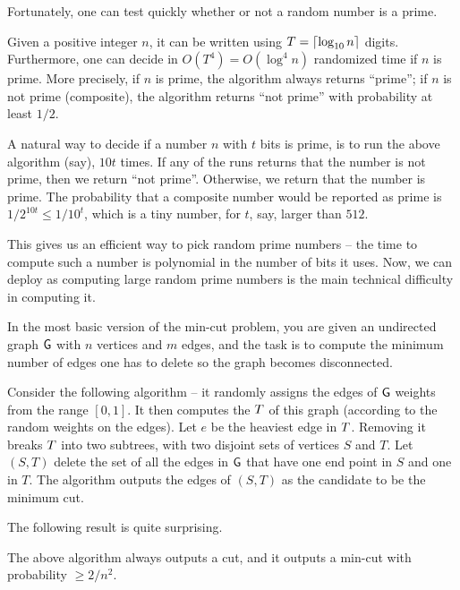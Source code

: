 Fortunately, one can test quickly whether or not a random number is a
prime. 
\begin{theorem}
    Given a positive integer $n$, it can be written using
    $T = \left\lceil {\log_{10} n} \right\rceil$ digits. Furthermore, one can decide in
    $O(T^4) = O( \log^4 n)$ randomized time if $n$ is prime. More
    precisely, if $n$ is prime, the algorithm always returns ``prime''; if $n$ is not prime (composite), the algorithm returns ``not prime'' with probability at least $1/2$.%
\end{theorem}

A natural way to decide if a number $n$ with $t$ bits is prime, is to run
the above algorithm (say), $10t$ times. If any of the runs returns that
the number is not prime, then we return ``not prime''. Otherwise, we
return that the number is prime. The probability that a composite number
would be reported as prime is $1/2^{10t} \leq 1/10^t$, which is a tiny
number, for $t$, say, larger than $512$.


This gives us an efficient way to pick random prime numbers -- the
time to compute such a number is polynomial in the number of bits it
uses. Now, we can deploy \RSA as computing large random prime numbers
is the main technical difficulty in computing it.



In the most basic version of the min-cut problem, you are given an
undirected graph $\mathsf{G}$ with $n$ vertices and $m$ edges, and the task is
to compute the minimum number of edges one has to delete so the graph
becomes disconnected.

Consider the following algorithm -- it randomly assigns the edges of
$\mathsf{G}$ weights from the range $[0,1]$. It then computes the \MST $T$
of this graph (according to the random weights on the edges). Let $e$
be the heaviest edge in $T$. Removing it breaks $T$ into two
subtrees, with two disjoint sets of vertices $S$ and $T$. Let $(S,T)$
delete the set of all the edges in $\mathsf{G}$ that have one end point in $S$
and one in $T$. The algorithm outputs the edges of $(S,T)$ as the
candidate to be the minimum cut.

The following result is quite surprising.

\begin{theorem}
    The above algorithm always outputs a cut, and it outputs a min-cut
    with probability $\geq 2/n^2$.
\end{theorem}

